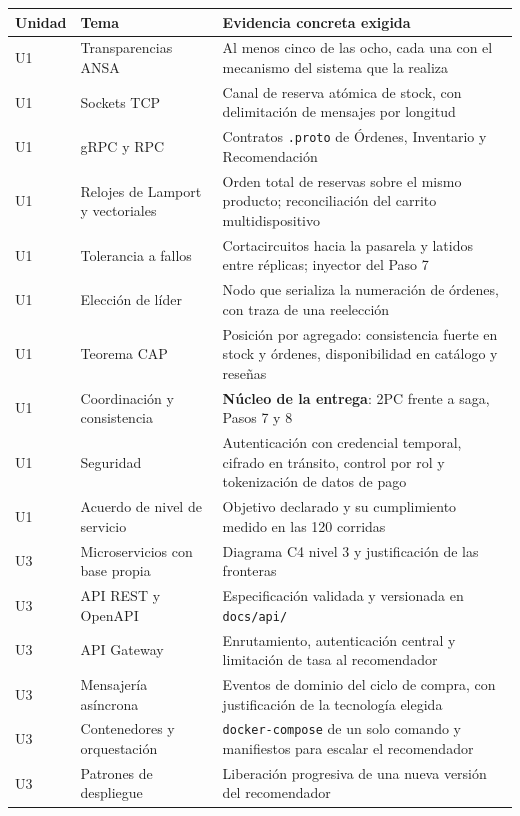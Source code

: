 \documentclass[11pt,a4paper]{article}
\begin{document}
	\begin{center}
		\footnotesize
		\begin{longtable}{@{}p{1.1cm}p{4.9cm}p{8.9cm}@{}}
			\toprule
			\textbf{Unidad} & \textbf{Tema} & \textbf{Evidencia concreta exigida} \\
			\midrule
			\endhead
			U1 & Transparencias ANSA & Al menos cinco de las ocho, cada una con el mecanismo del sistema que la realiza \\
			U1 & Sockets TCP & Canal de reserva atómica de stock, con delimitación de mensajes por longitud \\
			U1 & gRPC y RPC & Contratos \texttt{.proto} de Órdenes, Inventario y Recomendación \\
			U1 & Relojes de Lamport y vectoriales & Orden total de reservas sobre el mismo producto; reconciliación del carrito multidispositivo \\
			U1 & Tolerancia a fallos & Cortacircuitos hacia la pasarela y latidos entre réplicas; inyector del Paso 7 \\
			U1 & Elección de líder & Nodo que serializa la numeración de órdenes, con traza de una reelección \\
			U1 & Teorema CAP & Posición por agregado: consistencia fuerte en stock y órdenes, disponibilidad en catálogo y reseñas \\
			U1 & Coordinación y consistencia & \textbf{Núcleo de la entrega}: 2PC frente a saga, Pasos 7 y 8 \\
			U1 & Seguridad & Autenticación con credencial temporal, cifrado en tránsito, control por rol y tokenización de datos de pago \\
			U1 & Acuerdo de nivel de servicio & Objetivo declarado y su cumplimiento medido en las 120 corridas \\
			U3 & Microservicios con base propia & Diagrama C4 nivel 3 y justificación de las fronteras \\
			U3 & API REST y OpenAPI & Especificación validada y versionada en \texttt{docs/api/} \\
			U3 & API Gateway & Enrutamiento, autenticación central y limitación de tasa al recomendador \\
			U3 & Mensajería asíncrona & Eventos de dominio del ciclo de compra, con justificación de la tecnología elegida \\
			U3 & Contenedores y orquestación & \texttt{docker-compose} de un solo comando y manifiestos para escalar el recomendador \\
			U3 & Patrones de despliegue & Liberación progresiva de una nueva versión del recomendador \\

\end{longtable}
\end{center}
\end{document}
